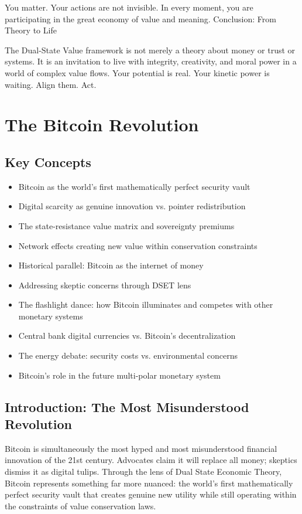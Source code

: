 \documentclass[11pt,oneside]{book}
\begin{document}
You matter. Your actions are not invisible. In every moment, you are participating in the great economy of value and meaning.
Conclusion: From Theory to Life

The Dual-State Value framework is not merely a theory about money or trust or systems. It is an invitation to live with integrity, creativity, and moral power in a world of complex value flows. Your potential is real. Your kinetic power is waiting. Align them. Act.


\chapter{The Bitcoin Revolution}

\section{Key Concepts}

\begin{itemize}
\item Bitcoin as the world's first mathematically perfect security vault
\item Digital scarcity as genuine innovation vs. pointer redistribution
\item The state-resistance value matrix and sovereignty premiums
\item Network effects creating new value within conservation constraints
\item Historical parallel: Bitcoin as the internet of money
\item Addressing skeptic concerns through DSET lens
\item The flashlight dance: how Bitcoin illuminates and competes with other monetary systems
\item Central bank digital currencies vs. Bitcoin's decentralization
\item The energy debate: security costs vs. environmental concerns
\item Bitcoin's role in the future multi-polar monetary system
\end{itemize}

\section{Introduction: The Most Misunderstood Revolution}

Bitcoin is simultaneously the most hyped and most misunderstood financial innovation of the 21st century. Advocates claim it will replace all money; skeptics dismiss it as digital tulips. Through the lens of Dual State Economic Theory, Bitcoin represents something far more nuanced: the world's first mathematically perfect security vault that creates genuine new utility while still operating within the constraints of value conservation laws.
\end{document}
